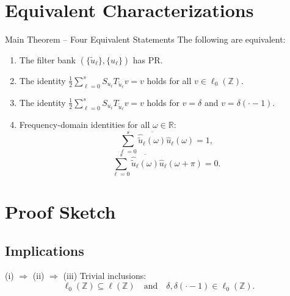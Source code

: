 \documentclass[11pt]{beamer}
\begin{document}
\section{Equivalent Characterizations}

\begin{frame}{Main Theorem -- Four Equivalent Statements}
  The following are equivalent:

  \begin{enumerate}
    \item The filter bank $(\{\tilde u_\ell\},\{u_\ell\})$ has PR.
    \item The identity $\displaystyle\frac12\sum_{\ell=0}^{s} S_{u_\ell}T_{\tilde u_\ell}v = v$ holds for all $v\in\ell_0(\mathbb{Z})$.
    \item The identity $\displaystyle\frac12\sum_{\ell=0}^{s} S_{u_\ell}T_{\tilde u_\ell}v = v$ holds for $v=\delta$ and $v=\delta(\cdot-1)$.
    \item Frequency-domain identities for all $\omega\in\mathbb{R}$:
          \[
            \sum_{\ell=0}^{s}\overline{\hat{\tilde u}_\ell(\omega)}\hat u_\ell(\omega)=1,
          \]
          \[
            \sum_{\ell=0}^{s}\overline{\hat{\tilde u}_\ell(\omega)}\hat u_\ell(\omega+\pi)=0.
          \]
  \end{enumerate}
\end{frame}

\section{Proof Sketch}

\subsection*{Implications}

\begin{frame}{(i) $\Rightarrow$ (ii) $\Rightarrow$ (iii)}
  Trivial inclusions:
  \[
    \ell_0(\mathbb{Z})\subseteq \ell(\mathbb{Z})\quad\text{and}\quad \delta,\delta(\cdot-1)\in\ell_0(\mathbb{Z}).
  \]
\end{frame}
\end{document}
